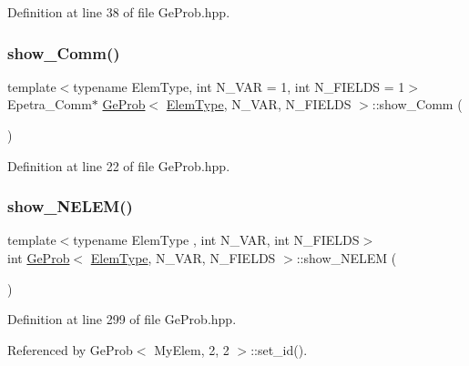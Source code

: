 Definition at line 38 of file Ge\+Prob.\+hpp.

\mbox{\label{classGeProb_a810c17dc99110efbb57b8ad28adc5cb7}} 
\subsubsection{\texorpdfstring{show\+\_\+\+Comm()}{show\_Comm()}}
{\footnotesize\ttfamily template$<$typename Elem\+Type, int N\+\_\+\+V\+AR = 1, int N\+\_\+\+F\+I\+E\+L\+DS = 1$>$ \\
Epetra\+\_\+\+Comm$\ast$ \hyperlink{classGeProb}{Ge\+Prob}$<$ \hyperlink{spectral_8h_aaa2c1a7b2d1b12c590d730fe6ac839fa}{Elem\+Type}, N\+\_\+\+V\+AR, N\+\_\+\+F\+I\+E\+L\+DS $>$\+::show\+\_\+\+Comm (\begin{DoxyParamCaption}{ }\end{DoxyParamCaption})\hspace{0.3cm}{\ttfamily [inline]}}



Definition at line 22 of file Ge\+Prob.\+hpp.

\mbox{\label{classGeProb_aa9c2c6d251e061c3cf58806097c55f04}} 
\subsubsection{\texorpdfstring{show\+\_\+\+N\+E\+L\+E\+M()}{show\_NELEM()}}
{\footnotesize\ttfamily template$<$typename Elem\+Type , int N\+\_\+\+V\+AR, int N\+\_\+\+F\+I\+E\+L\+DS$>$ \\
int \hyperlink{classGeProb}{Ge\+Prob}$<$ \hyperlink{spectral_8h_aaa2c1a7b2d1b12c590d730fe6ac839fa}{Elem\+Type}, N\+\_\+\+V\+AR, N\+\_\+\+F\+I\+E\+L\+DS $>$\+::show\+\_\+\+N\+E\+L\+EM (\begin{DoxyParamCaption}{ }\end{DoxyParamCaption})}



Definition at line 299 of file Ge\+Prob.\+hpp.



Referenced by Ge\+Prob$<$ My\+Elem, 2, 2 $>$\+::set\+\_\+id().

